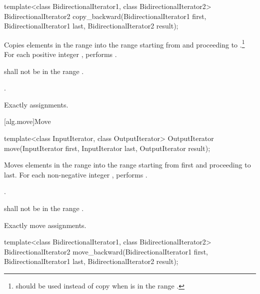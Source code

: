 %
\begin{itemdecl}
template<class BidirectionalIterator1, class BidirectionalIterator2>
  BidirectionalIterator2
    copy_backward(BidirectionalIterator1 first,
                  BidirectionalIterator1 last,
                  BidirectionalIterator2 result);
\end{itemdecl}

\begin{itemdescr}
\pnum
\effects
Copies elements in the range 
into the
range 
starting from
and proceeding to .\footnote{
should be used instead of copy when 
is in
the range
.}
For each positive integer
,
performs
.

\pnum
\requires
{}
shall not be in the range
.

\pnum
\returns
{}.

\pnum
\complexity
Exactly
assignments.
\end{itemdescr}

[alg.move]{Move}

%
\begin{itemdecl}
template<class InputIterator, class OutputIterator>
  OutputIterator move(InputIterator first, InputIterator last,
                      OutputIterator result);
\end{itemdecl}


\begin{itemdescr}
\pnum
\effects
Moves elements in the range 
into the range 
starting from first and proceeding to last.
For each non-negative integer
,
performs
 .

\pnum
\returns
{}.

\pnum
\requires
{}
shall not be in the range
.

\pnum
\complexity
Exactly
move assignments.
\end{itemdescr}

%
\begin{itemdecl}
template<class BidirectionalIterator1, class BidirectionalIterator2>
  BidirectionalIterator2
    move_backward(BidirectionalIterator1 first,
                  BidirectionalIterator1 last,
                  BidirectionalIterator2 result);
\end{itemdecl}


